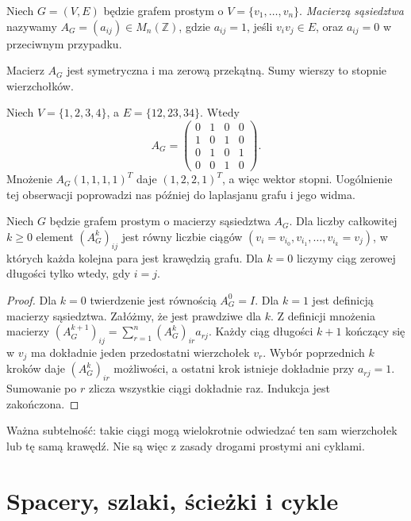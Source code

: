 \begin{definicja}
Niech $G=(V,E)$ będzie grafem prostym o
$V=\{v_1,\ldots,v_n\}$. \emph{Macierzą sąsiedztwa}
nazywamy $A_G=(a_{ij})\in M_n(\mathbb Z)$,
gdzie $a_{ij}=1$, jeśli $v_iv_j\in E$, oraz
$a_{ij}=0$ w przeciwnym przypadku.
\end{definicja}

Macierz $A_G$ jest symetryczna i ma zerową przekątną.
Sumy wierszy to stopnie wierzchołków.

\begin{przyklad}
Niech $V=\{1,2,3,4\}$, a $E=\{12,23,34\}$.
Wtedy
\[
A_G=\begin{pmatrix}
0&1&0&0\\1&0&1&0\\0&1&0&1\\0&0&1&0
\end{pmatrix}.
\]
Mnożenie $A_G(1,1,1,1)^T$ daje $(1,2,2,1)^T$,
a więc wektor stopni. Uogólnienie tej obserwacji
poprowadzi nas później do laplasjanu grafu i
jego widma.
\end{przyklad}

\begin{stwierdzenie}
Niech $G$ będzie grafem prostym o macierzy sąsiedztwa
$A_G$. Dla liczby całkowitej $k\ge0$ element
$(A_G^k)_{ij}$ jest równy liczbie ciągów
$(v_i=v_{i_0},v_{i_1},\ldots,v_{i_k}=v_j)$,
w których każda kolejna para jest krawędzią grafu.
Dla $k=0$ liczymy ciąg zerowej długości tylko wtedy,
gdy $i=j$.
\end{stwierdzenie}

\begin{proof}
Dla $k=0$ twierdzenie jest równością $A_G^0=I$.
Dla $k=1$ jest definicją macierzy sąsiedztwa.
Załóżmy, że jest prawdziwe dla $k$. Z definicji
mnożenia macierzy
$(A_G^{k+1})_{ij}=\sum_{r=1}^n(A_G^k)_{ir}a_{rj}$.
Każdy ciąg długości $k+1$ kończący się w $v_j$
ma dokładnie jeden przedostatni wierzchołek $v_r$.
Wybór poprzednich $k$ kroków daje $(A_G^k)_{ir}$
możliwości, a ostatni krok istnieje dokładnie przy
$a_{rj}=1$. Sumowanie po $r$ zlicza wszystkie
ciągi dokładnie raz. Indukcja jest zakończona.
\end{proof}

Ważna subtelność: takie ciągi mogą wielokrotnie odwiedzać
ten sam wierzchołek lub tę samą krawędź. Nie są więc z zasady
drogami prostymi ani cyklami.

\section{Spacery, szlaki, ścieżki i cykle}
\label{sec:tg-drogi}

